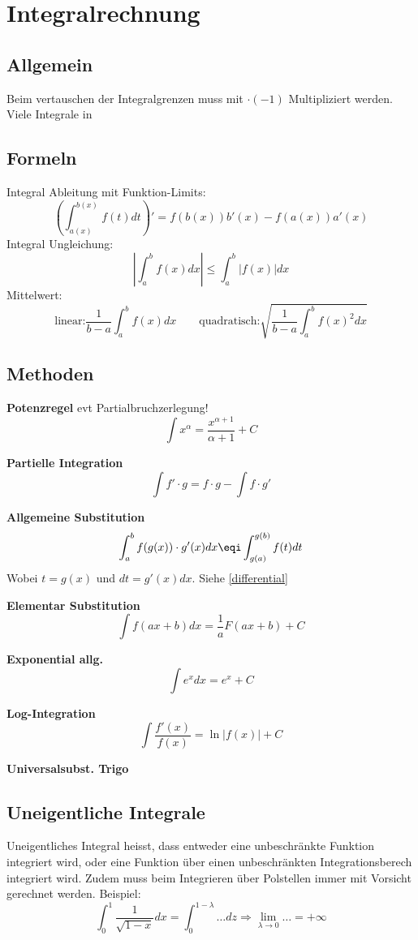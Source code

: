 \section{Integralrechnung}
\subsection{Allgemein}
Beim vertauschen der Integralgrenzen muss mit $\cdot (-1)$ Multipliziert werden. Viele Integrale in 

\subsection{Formeln}
\noindent Integral Ableitung mit Funktion-Limits: \[\left(\int_{a(x)}^{b(x)}f(t)dt\right)' = f(b(x))b'(x) - f(a(x))a'(x)\]
\noindent Integral Ungleichung:
\[\left|\int_{a}^{b}f(x)dx\right| \leq \int_{a}^{b}\left|f(x)\right|dx\]
\noindent Mittelwert:
\[\text{linear:} \frac{1}{b-a}\int_{a}^{b}f(x)dx \qquad \text{quadratisch:} \sqrt{\frac{1}{b-a}\int_{a}^{b}f(x)^2dx}\]


\subsection{Methoden}
\noindent\textbf{Potenzregel} evt Partialbruchzerlegung!
\[ \int x^\alpha = \frac{x^{\alpha  + 1}}{\alpha + 1} + C \]

\noindent\textbf{Partielle Integration}
\[\int f' \cdot g = f \cdot g - \int f \cdot g'\]

\noindent\textbf{Allgemeine Substitution}
\[\int_{a}^{b} f(g(x)) \cdot g'(x)dx \eqi \int_{g(a)}^{g(b)} f(t) dt\]
Wobei $t=g(x)$ und $dt = g'(x)dx$. Siehe \ref{differential}

\noindent\textbf{Elementar Substitution}
\[\int f(ax + b)dx = \frac{1}{a}F(ax+b)+C\]

\noindent\textbf{Exponential allg.}
\[\int e^xdx = e^x + C\]

\noindent\textbf{Log-Integration}
\[\int \frac{f'(x)}{f(x)} = \ln\left|f(x)\right| + C\]

\noindent\textbf{Universalsubst. Trigo}\\

\subsection{Uneigentliche Integrale}
Uneigentliches Integral heisst, dass entweder eine unbeschränkte Funktion integriert wird, oder eine Funktion über einen unbeschränkten Integrationsberech integriert wird. Zudem muss beim Integrieren über Polstellen immer mit Vorsicht gerechnet werden. Beispiel: 
\[\int_{0}^{1}\frac{1}{\sqrt{1-x}}dx = \int_{0}^{1-\lambda}\dots dz \Rightarrow \lim\limits_{\lambda \rightarrow 0}\dots = +\infty\]

